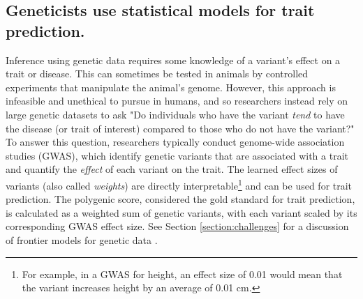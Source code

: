 \subsection{Geneticists use statistical models for trait prediction.}
Inference using genetic data requires some knowledge of a variant's effect on a trait or disease. This can sometimes be tested in animals by controlled experiments that manipulate the animal's genome. However, this approach is infeasible and unethical to pursue in humans, and so researchers instead rely on large genetic datasets to ask "Do individuals who have the variant \textit{tend} to have the disease (or trait of interest) compared to those who do not have the variant?" To answer this question, researchers typically conduct genome-wide association studies (GWAS), which identify genetic variants that are associated with a trait and quantify the \emph{effect} of each variant on the trait. The learned effect sizes of variants (also called \textit{weights}) are directly interpretable\footnote{For example, in a GWAS for height, an effect size of 0.01 would mean that the variant increases height by an average of 0.01 cm.} and can be used for trait prediction. The polygenic score, considered the gold standard for trait prediction, is calculated as a weighted sum of genetic variants, with each variant scaled by its corresponding GWAS effect size. See Section \ref{section:challenges} for a discussion of frontier models for genetic data \cite{fritzsche_ethical_2023}.


